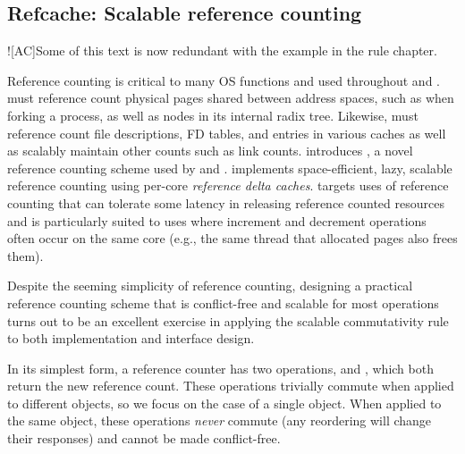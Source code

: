 \subsection{Refcache: Scalable reference counting}
\label{sec:sv6:refcache}

\XXX![AC]{Some of this text is now redundant with the example in the
  rule chapter.}

Reference counting is critical to many OS functions and used
throughout \vm and \fs.  \vm must reference count physical pages
shared between address spaces, such as when forking a process, as well
as nodes in its internal radix tree.  Likewise, \fs must reference
count file descriptions, FD tables, and entries in various caches as
well as scalably maintain other counts such as link counts.
%
 introduces , a novel reference
counting scheme
used by \vm and \fs.   implements space-efficient, lazy,
scalable reference counting using per-core \emph{reference delta
  caches}.   targets uses of reference counting that can
tolerate some latency in releasing reference counted resources and is
particularly suited to uses where increment and decrement operations
often occur on the same core (e.g., the same thread that allocated
pages also frees them).


Despite the seeming simplicity of reference counting, designing a
practical reference counting scheme that is conflict-free and scalable
for most operations turns out to be an excellent exercise in applying
the scalable commutativity rule to both implementation and interface
design.

In its simplest form, a reference counter has two operations,
 and , which both return the new
reference count.  These operations trivially commute when applied to
different objects, so we focus on the case of a single object.  When
applied to the same object, these operations \emph{never} commute (any
reordering will change their responses) and cannot be made
conflict-free.

